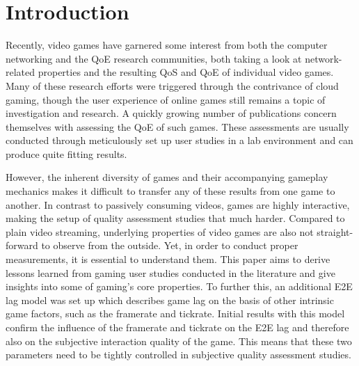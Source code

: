 \section{Introduction}
\label{sec:introduction}

Recently, video games have garnered some interest from both the computer networking and the \gls{QoE} research communities, both taking a look at network-related properties and the resulting \acrshort{QoS} and \gls{QoE} of individual video games. Many of these research efforts were triggered through the contrivance of cloud gaming, though the user experience of online games still remains a topic of investigation and research. A quickly growing number of publications concern themselves with assessing the \gls{QoE} of such games. These assessments are usually conducted through meticulously set up user studies in a lab environment and can produce quite fitting results.

However, the inherent diversity of games and their accompanying gameplay mechanics makes it difficult to transfer any of these results from one game to another. In contrast to passively consuming videos, games are highly interactive, making the setup of quality assessment studies that much harder. Compared to plain video streaming, underlying properties of video games are also not straight-forward to observe from the outside. Yet, in order to conduct proper measurements, it is essential to understand them. This paper aims to derive lessons learned from gaming user studies conducted in the literature and give insights into some of gaming's core properties. To further this, an additional \gls{E2E} lag model was set up which describes game lag on the basis of other intrinsic game factors, such as the framerate and tickrate. Initial results with this model confirm the influence of the framerate and tickrate on the \gls{E2E} lag and therefore also on the subjective interaction quality of the game. This means that these two parameters need to be tightly controlled in subjective quality assessment studies.
